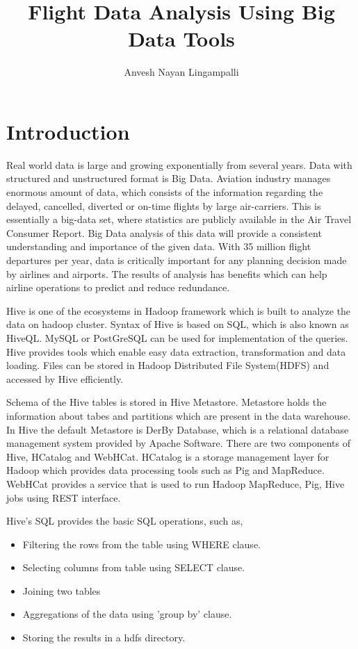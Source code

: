 \documentclass[9pt,twocolumn,twoside]{../../styles/osajnl}
\title{Flight Data Analysis Using Big Data Tools}
\author[1,*]{Anvesh Nayan Lingampalli}
\affil[1]{School of Informatics and Computing, Bloomington, IN 47408, U.S.A.}
\affil[*]{Corresponding authors:anveling@indiana.edu}
\begin{document}
\maketitle

\section{Introduction}

Real world data is large and growing exponentially from several
years. Data with structured and unstructured format is Big
Data. Aviation industry manages enormous amount of data, which
consists of the information regarding the delayed, cancelled, diverted
or on-time flights by large air-carriers\cite{aviationanalysis}. This
is essentially a big-data set, where statistics are publicly available
in the Air Travel Consumer Report. Big Data analysis of this data will
provide a consistent understanding and importance of the given
data. With 35 million flight departures per year, data is critically
important for any planning decision made by airlines and airports. The
results of analysis has benefits which can help airline operations to
predict and reduce redundance\cite{bigdatainaviation}.

Hive is one of the ecosystems in Hadoop framework which is built to
analyze the data on hadoop cluster. Syntax of Hive is based on SQL,
which is also known as HiveQL. MySQL or PostGreSQL can be used for
implementation of the queries. Hive provides tools which enable easy
data extraction, transformation and data loading. Files can be stored
in Hadoop Distributed File System(HDFS) and accessed by Hive
efficiently.

Schema of the Hive tables is stored in Hive Metastore. Metastore holds
the information about tabes and partitions which are present in the
data warehouse. In Hive the default Metastore is DerBy Database, which
is a relational database management system provided by Apache
Software.  There are two components of Hive, HCatalog and
WebHCat. HCatalog is a storage management layer for Hadoop which
provides data processing tools such as Pig and MapReduce. WebHCat
provides a service that is used to run Hadoop MapReduce, Pig, Hive
jobs using REST interface.

Hive's SQL provides the basic SQL operations, such as,
\begin{itemize}
\item Filtering the rows from the table using WHERE clause.
\item Selecting columns from table using SELECT clause.
\item Joining two tables
\item Aggregations of the data using 'group by' clause.
\item Storing the results in a hdfs directory.
\end{itemize}
  
\end{document}

